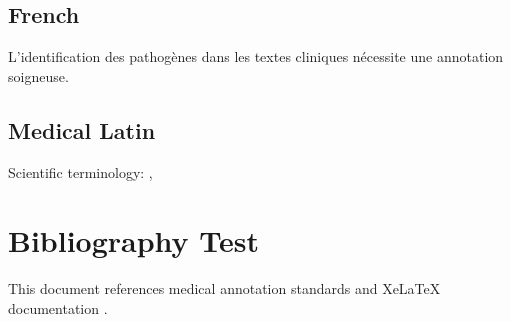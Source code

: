 \documentclass[11pt,a4paper]{article}
\begin{document}
\subsection{French}
\textfrench{L'identification des pathogènes dans les textes cliniques nécessite une annotation soigneuse.}

\subsection{Medical Latin}
Scientific terminology: , 

\section{Bibliography Test}
This document references medical annotation standards \cite{bratstandards2024} and XeLaTeX documentation \cite{xelatex2024}.

\printbibliography
\end{document}

